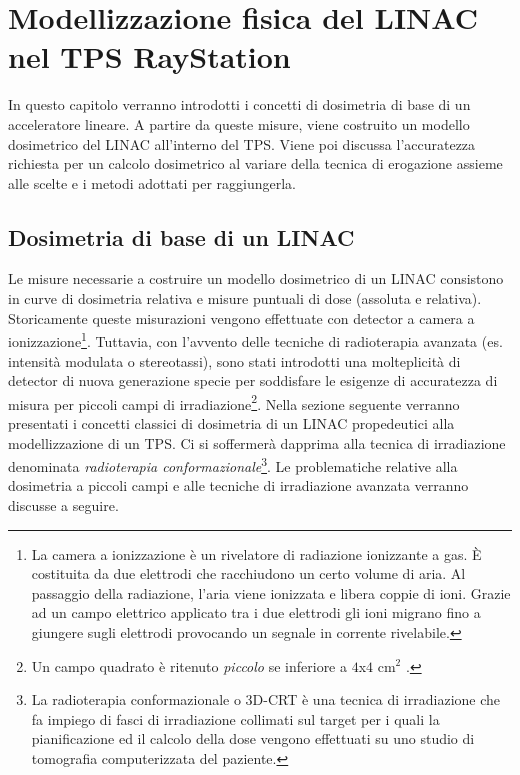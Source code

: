 \chapter{Modellizzazione f{}isica del LINAC nel TPS RayStation}
\minitoc
\textsf{In questo capitolo verranno introdotti i concetti di dosimetria di base di un acceleratore lineare. A partire da queste misure, viene costruito un modello dosimetrico del LINAC all'interno del TPS. Viene poi discussa l'accuratezza richiesta per un calcolo dosimetrico al variare della tecnica di erogazione assieme alle scelte e i metodi adottati per raggiungerla.}



\section{Dosimetria di base di un LINAC}
Le misure necessarie a costruire un modello dosimetrico di un LINAC consistono in curve di dosimetria relativa e misure puntuali di dose (assoluta e relativa).\\
Storicamente queste misurazioni vengono effettuate con detector a camera a ionizzazione\footnote{La camera a ionizzazione è un rivelatore di radiazione ionizzante a gas. \`E costituita da due elettrodi che racchiudono un certo volume di aria. Al passaggio della radiazione, l'aria viene ionizzata e libera coppie di ioni. Grazie ad un campo elettrico applicato tra i due elettrodi gli ioni migrano fino a giungere sugli elettrodi provocando un segnale in corrente rivelabile.}. Tuttavia, con l'avvento delle tecniche di radioterapia avanzata (es. intensità modulata o stereotassi), sono stati introdotti una molteplicità di detector di nuova generazione specie per soddisfare le esigenze di accuratezza di misura per piccoli campi di irradiazione\footnote{Un campo quadrato è ritenuto \textit{piccolo} se inferiore a $4$x$4$ cm$^2$ \cite{Das2008}.}. Nella sezione seguente verranno presentati i concetti classici di dosimetria di un LINAC propedeutici alla modellizzazione di un TPS. Ci si soffermerà dapprima alla tecnica di irradiazione denominata \textit{radioterapia conformazionale}\footnote{La radioterapia conformazionale o 3D-CRT è una tecnica di irradiazione che  fa impiego di fasci di irradiazione collimati sul target per i quali la pianificazione ed il calcolo della dose vengono effettuati su uno studio di tomografia computerizzata del paziente.}. Le problematiche relative alla dosimetria a piccoli campi e alle tecniche di irradiazione avanzata verranno discusse a seguire. 

